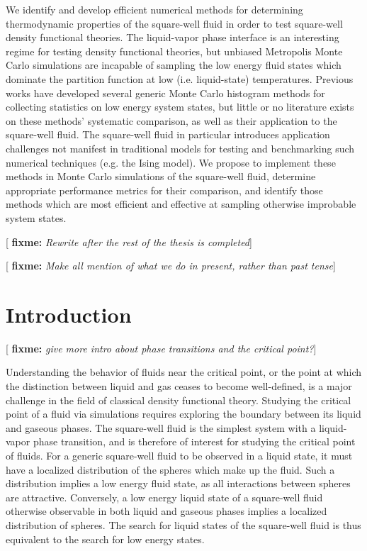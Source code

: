 \documentclass[11pt]{article}
\newcommand{\red}[1]{{\bf \color{red} #1}}
\newcommand{\fixme}[1]{[\red{fixme:} \emph{#1}]}
\begin{document}
\thispagestyle{abstract}

We identify and develop efficient numerical methods for determining
thermodynamic properties of the square-well fluid in order to test
square-well density functional theories. The liquid-vapor phase
interface is an interesting regime for testing density functional
theories, but unbiased Metropolis Monte Carlo simulations are
incapable of sampling the low energy fluid states which dominate the
partition function at low (i.e. liquid-state) temperatures. Previous
works have developed several generic Monte Carlo histogram methods for
collecting statistics on low energy system states, but little or no
literature exists on these methods' systematic comparison, as well as
their application to the square-well fluid. The square-well fluid in
particular introduces application challenges not manifest in
traditional models for testing and benchmarking such numerical
techniques (e.g. the Ising model). We propose to implement these
methods in Monte Carlo simulations of the square-well fluid, determine
appropriate performance metrics for their comparison, and identify
those methods which are most efficient and effective at sampling
otherwise improbable system states.

\fixme{Rewrite after the rest of the thesis is completed}

\fixme{Make all mention of what we do in present, rather than past
  tense}


\newpage


\section{Introduction}
\label{sec:intro}

\fixme{give more intro about phase transitions and the critical
  point?}

Understanding the behavior of fluids near the critical point, or the
point at which the distinction between liquid and gas ceases to become
well-defined, is a major challenge in the field of classical density
functional theory. Studying the critical point of a fluid via
simulations requires exploring the boundary between its liquid and
gaseous phases. The square-well fluid is the simplest system with a
liquid-vapor phase transition, and is therefore of interest for
studying the critical point of fluids. For a generic square-well fluid
to be observed in a liquid state, it must have a localized
distribution of the spheres which make up the fluid. Such a
distribution implies a low energy fluid state, as all interactions
between spheres are attractive. Conversely, a low energy liquid state
of a square-well fluid otherwise observable in both liquid and gaseous
phases implies a localized distribution of spheres. The search for
liquid states of the square-well fluid is thus equivalent to the
search for low energy states.
\end{document}
